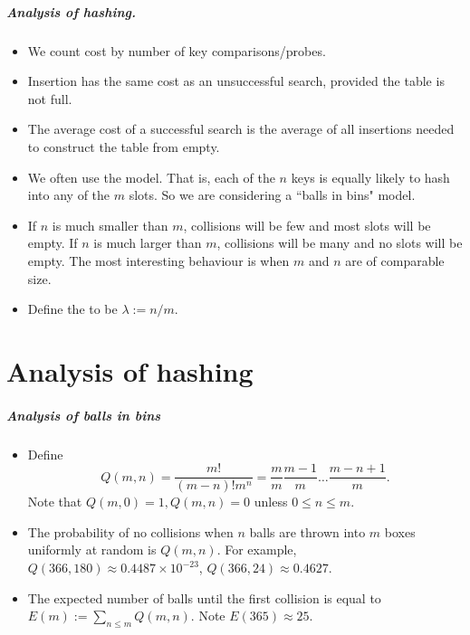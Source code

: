 \paragraph{Analysis of hashing.}
\begin{itemize}
\item We count cost by number of key comparisons/probes.
\item Insertion has the same cost as an unsuccessful search, provided the table 
is not full.
\item The average cost of a successful search is the average of all insertions
 needed to construct the table from empty.
\item We often use the  model. That is, each of 
the $n$ keys is equally likely to hash into any of the $m$ slots. So we are 
considering a ``balls in bins" model.
\item If $n$ is much smaller than $m$, collisions will be few and most slots 
will be empty. If $n$ is much larger than $m$, collisions will be many and no 
slots will be empty. The most interesting behaviour is when $m$ and $n$ are 
of comparable size.
\item Define the  to be $\lambda := n/m$.
\end{itemize}

\chapter{Analysis of hashing} %

\paragraph{Analysis of balls in bins}
\begin{itemize}
\item Define 
$$Q(m, n) = \frac{m!}{(m-n)! m^n} = \frac{m}{m} \frac{m-1}{m} \dots 
\frac{m - n + 1}{m}.$$
Note that $Q(m,0) = 1, Q(m, n) = 0$ unless $0 \leq n \leq m$.
\item The probability of no collisions when $n$ balls are thrown into $m$ boxes 
uniformly at random is $Q(m, n)$. For example, $Q(366, 180) \approx 0.4487
 \times 10^{-23}$, $Q(366, 24) \approx  0.4627$. 
\item The expected number of balls until the first collision is equal to 
$E(m):=\sum_{n \leq m} Q(m, n)$. Note $E(365) \approx 25$.
\end{itemize}

